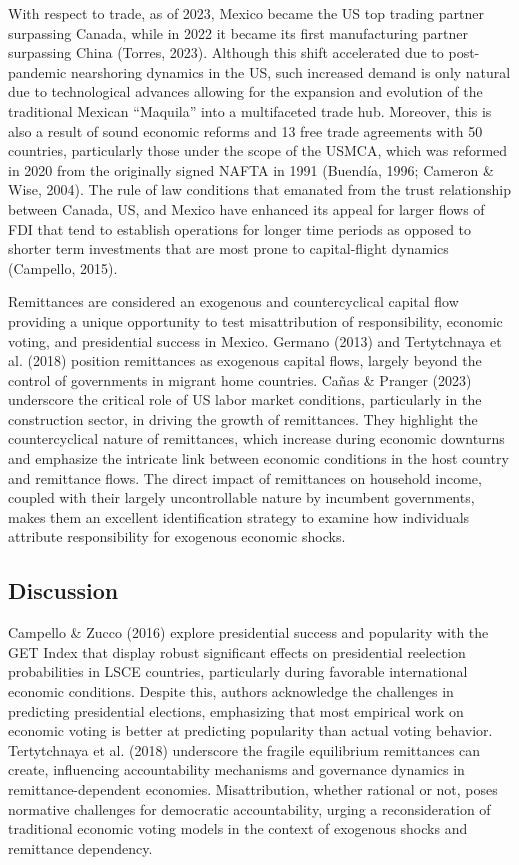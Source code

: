 \documentclass[
]{article}
\begin{document}
With respect to trade, as of 2023, Mexico became the US top trading
partner surpassing Canada, while in 2022 it became its first
manufacturing partner surpassing China (Torres, 2023). Although this
shift accelerated due to post-pandemic nearshoring dynamics in the US,
such increased demand is only natural due to technological advances
allowing for the expansion and evolution of the traditional Mexican
``Maquila'' into a multifaceted trade hub. Moreover, this is also a
result of sound economic reforms and 13 free trade agreements with 50
countries, particularly those under the scope of the USMCA, which was
reformed in 2020 from the originally signed NAFTA in 1991 (Buendía,
1996; Cameron \& Wise, 2004). The rule of law conditions that emanated
from the trust relationship between Canada, US, and Mexico have enhanced
its appeal for larger flows of FDI that tend to establish operations for
longer time periods as opposed to shorter term investments that are most
prone to capital-flight dynamics (Campello, 2015).

Remittances are considered an exogenous and countercyclical capital flow
providing a unique opportunity to test misattribution of responsibility,
economic voting, and presidential success in Mexico. Germano (2013) and
Tertytchnaya et al. (2018) position remittances as exogenous capital
flows, largely beyond the control of governments in migrant home
countries. Cañas \& Pranger (2023) underscore the critical role of US
labor market conditions, particularly in the construction sector, in
driving the growth of remittances. They highlight the countercyclical
nature of remittances, which increase during economic downturns and
emphasize the intricate link between economic conditions in the host
country and remittance flows. The direct impact of remittances on
household income, coupled with their largely uncontrollable nature by
incumbent governments, makes them an excellent identification strategy
to examine how individuals attribute responsibility for exogenous
economic shocks.

\hypertarget{discussion}{%
\subsection{Discussion}\label{discussion}}

Campello \& Zucco (2016) explore presidential success and popularity
with the GET Index that display robust significant effects on
presidential reelection probabilities in LSCE countries, particularly
during favorable international economic conditions. Despite this,
authors acknowledge the challenges in predicting presidential elections,
emphasizing that most empirical work on economic voting is better at
predicting popularity than actual voting behavior. Tertytchnaya et al.
(2018) underscore the fragile equilibrium remittances can create,
influencing accountability mechanisms and governance dynamics in
remittance-dependent economies. Misattribution, whether rational or not,
poses normative challenges for democratic accountability, urging a
reconsideration of traditional economic voting models in the context of
exogenous shocks and remittance dependency.
\end{document}
